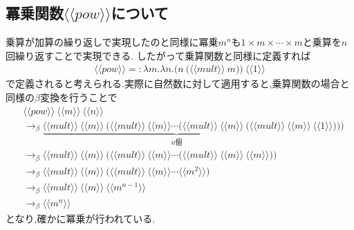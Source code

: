 \documentclass[uplatex,a4j,11pt,dvipdfmx]{jsarticle}
\newcommand{\llr}{\langle\langle}
\newcommand{\rrr}{\rangle\rangle}
\begin{document}
\subsection*{冪乗関数$\llr pow\rrr$について}
乗算が加算の繰り返しで実現したのと同様に冪乗$m^n$も$1\times m\times\cdots\times m$と乗算を$n$回繰り返すことで実現できる.
したがって乗算関数と同様に定義すれば
\begin{align*}
  \llr pow\rrr=:\lambda m.\lambda n.\bigg(n\ \Big(\llr mult\rrr\ m\Big)\bigg)\ \llr 1\rrr
\end{align*}
で定義されると考えられる.\cite{utokyo}実際に自然数に対して適用すると,乗算関数の場合と同様の$\beta$変換を行うことで
\begin{align*}
  &\llr pow\rrr\ \llr m\rrr\ \llr n\rrr\\
  &\rightarrow_\beta \underbrace{\llr mult\rrr\ \llr m\rrr\ \Bigg(\llr mult\rrr\ \llr m\rrr\cdots\bigg(\llr mult\rrr\ \llr m\rrr\ \Big(\llr mult\rrr\ \llr m\rrr}_{n個}\ \llr 1\rrr\Big)\bigg)\Bigg)\\
  &\rightarrow_\beta \llr mult\rrr\ \llr m\rrr\ \bigg(\llr mult\rrr\ \llr m\rrr\cdots\Big(\llr mult\rrr\ \llr m\rrr\ \llr m\rrr\Big)\bigg)\\
  &\rightarrow_\beta \llr mult\rrr\ \llr m\rrr\ \Big(\llr mult\rrr\ \llr m\rrr\cdots\llr m^2\rrr\Big)\\
  &\rightarrow_\beta \llr mult\rrr\ \llr m\rrr\ \llr m^{n-1}\rrr\\
  &\rightarrow_\beta\llr m^n\rrr
\end{align*}
となり,確かに冪乗が行われている.

\end{document}
